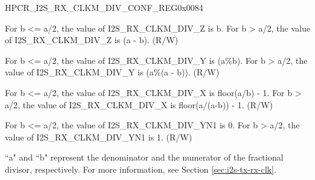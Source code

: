 \begin{register}{H}{PCR\_I2S\_RX\_CLKM\_DIV\_CONF\_REG}{0x0084}\label{regdesc:PCRI2SRXCLKMDIVCONFREG}
%
%
%
%
%
\regnewline%
\begin{regdesc}\begin{reglist}
\label{fielddesc:PCRI2SRXCLKMDIVZ}\item [PCR\_I2S\_RX\_CLKM\_DIV\_Z] For b <= a/2, the value of I2S\_RX\_CLKM\_DIV\_Z is b. For b > a/2, the value of I2S\_RX\_CLKM\_DIV\_Z is (a - b). (R/W)
\label{fielddesc:PCRI2SRXCLKMDIVY}\item [PCR\_I2S\_RX\_CLKM\_DIV\_Y] For b <= a/2, the value of I2S\_RX\_CLKM\_DIV\_Y is (a\%b). For b > a/2, the value of I2S\_RX\_CLKM\_DIV\_Y is (a\%(a - b)). (R/W)
\label{fielddesc:PCRI2SRXCLKMDIVX}\item [PCR\_I2S\_RX\_CLKM\_DIV\_X] For b <= a/2, the value of I2S\_RX\_CLKM\_DIV\_X is floor(a/b) - 1. For b > a/2, the value of I2S\_RX\_CLKM\_DIV\_X is floor(a/(a-b)) - 1. (R/W)
\label{fielddesc:PCRI2SRXCLKMDIVYN1}\item [PCR\_I2S\_RX\_CLKM\_DIV\_YN1] For b <= a/2, the value of I2S\_RX\_CLKM\_DIV\_YN1 is 0. For b > a/2, the value of I2S\_RX\_CLKM\_DIV\_YN1 is 1. (R/W)
\end{reglist}\end{regdesc}
\vspace{-2em}
\begin{tiplisting}
``a" and ``b" represent the denominator and the numerator of the fractional divisor, respectively. For more information, see Section \ref{sec:i2s-tx-rx-clk}.
\end{tiplisting}
\end{register}


